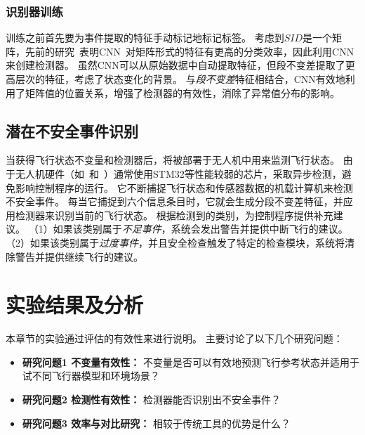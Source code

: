 \subsubsection{识别器训练}
训练之前首先要为事件提取的特征手动标记地标记标签。
考虑到$SID$是一个矩阵，先前的研究~\cite{girshick2015fast,shin2016deep}表明CNN~\cite{cnn}对矩阵形式的特征有更高的分类效率，因此\deccheck 利用CNN来创建检测器。
虽然CNN可以从原始数据中自动提取特征，但段不变差提取了更高层次的特征，考虑了状态变化的背景。
与\emph{段不变差}特征相结合，CNN有效地利用了矩阵值的位置关系，增强了检测器的有效性，消除了异常值分布的影响。

\subsection{潜在不安全事件识别}
当获得飞行状态不变量和检测器后，\deccheck 将被部署于无人机中用来监测飞行状态。
由于无人机硬件（如~\cite{meier2011pixhawk}和~\cite{ebeid2018survey}）通常使用STM32等性能较弱的芯片，\deccheck 采取异步检测，避免影响控制程序的运行。
它不断捕捉飞行状态和传感器数据的机载计算机来检测不安全事件。
每当它捕捉到六个信息条目时，它就会生成分段不变差特征，并应用检测器来识别当前的飞行状态。
根据检测到的类别，\deccheck 为控制程序提供补充建议。
（1）如果该类别属于\emph{不足事件}，系统会发出警告并提供中断飞行的建议。
（2）如果该类别属于\emph{过度事件}，并且安全检查触发了特定的检查模块，系统将清除警告并提供继续飞行的建议。

\section{实验结果及分析}
本章节的实验通过评估\deccheck 的有效性来进行说明。
主要讨论了以下几个研究问题：
\begin{itemize}
    \item \textbf{研究问题1 不变量有效性：} 不变量是否可以有效地预测飞行参考状态并适用于试不同飞行器模型和环境场景？
       
    \item \textbf{研究问题2 检测性有效性：} 检测器能否识别出不安全事件？
    
    \item \textbf{研究问题3 效率与对比研究：} 相较于传统工具\deccheck 的优势是什么？
    
    
\end{itemize}

